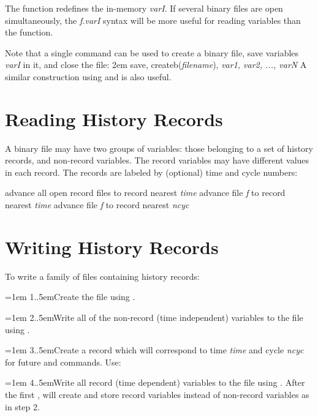 The  function redefines the in-memory
{\it varI\/}.  If several binary
files are open simultaneously, the {\it f.varI\/} syntax will be more
useful for reading variables than the  function.

Note that a single command can be used to create a binary file, save
variables {\it varI\/} in it, and close the file:
\beginexample
\hglue2em save, createb({\it filename\/}), {\it var1, var2, ..., varN}
\endexample
A similar construction using  and  is also useful.

\section{Reading History Records}

A binary file may have two groups of variables: those belonging to a set
of history records, and non-record variables.
The record variables may have different values in each record.  The records
are labeled by (optional) time and cycle numbers:

     {advance all open record files to record nearest {\it time}}
     {advance file {\it f\/} to record nearest {\it time}}
     {advance file {\it f\/} to record nearest {\it ncyc}}

\section{Writing History Records}

To write a family of files containing history records:

\hangindent=1em
1.\hglue.5emCreate the file using .

\hangindent=1em
2.\hglue.5emWrite all of the non-record (time independent) variables to the
file using .

\hangindent=1em
3.\hglue.5emCreate a record which will correspond to time {\it time} and cycle
{\it ncyc} for future  and  commands.  Use:


\hangindent=1em
4.\hglue.5emWrite all record (time dependent) variables to the file using
.  After the first ,  will create and
store record variables instead of non-record variables as in step 2.

